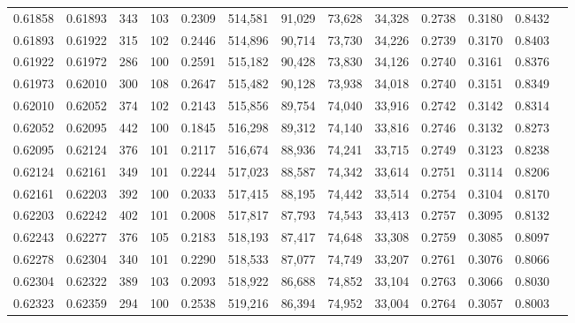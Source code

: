 \begin{tabular}{rrrrrrrrrrrrr}
0.61858 & 0.61893 &   343 & 103 &                                     0.2309 & 514,581 &  91,029 &  73,628 &  34,328 & 0.2738 & 0.3180 & 0.8432 \\
0.61893 & 0.61922 &   315 & 102 &                                     0.2446 & 514,896 &  90,714 &  73,730 &  34,226 & 0.2739 & 0.3170 & 0.8403 \\
0.61922 & 0.61972 &   286 & 100 &                                     0.2591 & 515,182 &  90,428 &  73,830 &  34,126 & 0.2740 & 0.3161 & 0.8376 \\
0.61973 & 0.62010 &   300 & 108 &                                     0.2647 & 515,482 &  90,128 &  73,938 &  34,018 & 0.2740 & 0.3151 & 0.8349 \\
0.62010 & 0.62052 &   374 & 102 &                                     0.2143 & 515,856 &  89,754 &  74,040 &  33,916 & 0.2742 & 0.3142 & 0.8314 \\
0.62052 & 0.62095 &   442 & 100 &                                     0.1845 & 516,298 &  89,312 &  74,140 &  33,816 & 0.2746 & 0.3132 & 0.8273 \\
0.62095 & 0.62124 &   376 & 101 &                                     0.2117 & 516,674 &  88,936 &  74,241 &  33,715 & 0.2749 & 0.3123 & 0.8238 \\
0.62124 & 0.62161 &   349 & 101 &                                     0.2244 & 517,023 &  88,587 &  74,342 &  33,614 & 0.2751 & 0.3114 & 0.8206 \\
0.62161 & 0.62203 &   392 & 100 &                                     0.2033 & 517,415 &  88,195 &  74,442 &  33,514 & 0.2754 & 0.3104 & 0.8170 \\
0.62203 & 0.62242 &   402 & 101 &                                     0.2008 & 517,817 &  87,793 &  74,543 &  33,413 & 0.2757 & 0.3095 & 0.8132 \\
0.62243 & 0.62277 &   376 & 105 &                                     0.2183 & 518,193 &  87,417 &  74,648 &  33,308 & 0.2759 & 0.3085 & 0.8097 \\
0.62278 & 0.62304 &   340 & 101 &                                     0.2290 & 518,533 &  87,077 &  74,749 &  33,207 & 0.2761 & 0.3076 & 0.8066 \\
0.62304 & 0.62322 &   389 & 103 &                                     0.2093 & 518,922 &  86,688 &  74,852 &  33,104 & 0.2763 & 0.3066 & 0.8030 \\
0.62323 & 0.62359 &   294 & 100 &                                     0.2538 & 519,216 &  86,394 &  74,952 &  33,004 & 0.2764 & 0.3057 & 0.8003 \\

\end{tabular}
